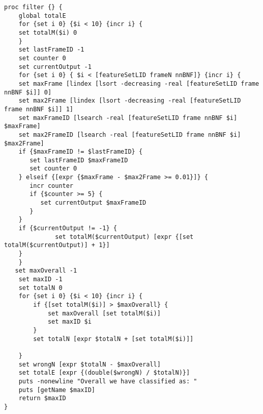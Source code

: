 \newpage
\begin{lstlisting}[label=lst:DifferenceFilter,caption=Difference Filter employed to smooth/improve output]
proc filter {} {
    global totalE
    for {set i 0} {$i < 10} {incr i} {
    set totalM($i) 0
    }
    set lastFrameID -1
    set counter 0
    set currentOutput -1
    for {set i 0} { $i < [featureSetLID frameN nnBNF]} {incr i} {
    set maxFrame [lindex [lsort -decreasing -real [featureSetLID frame nnBNF $i]] 0]
    set max2Frame [lindex [lsort -decreasing -real [featureSetLID frame nnBNF $i]] 1]
    set maxFrameID [lsearch -real [featureSetLID frame nnBNF $i] $maxFrame]
    set max2FrameID [lsearch -real [featureSetLID frame nnBNF $i] $max2Frame]
    if {$maxFrameID != $lastFrameID} {
       set lastFrameID $maxFrameID
       set counter 0
    } elseif {[expr {$maxFrame - $max2Frame >= 0.01}]} {
       incr counter
       if {$counter >= 5} {
          set currentOutput $maxFrameID
       }
    }
    if {$currentOutput != -1} {
              set totalM($currentOutput) [expr {[set totalM($currentOutput)] + 1}]
    }
    }
   set maxOverall -1
    set maxID -1
    set totalN 0
    for {set i 0} {$i < 10} {incr i} {
        if {[set totalM($i)] > $maxOverall} {
            set maxOverall [set totalM($i)]
            set maxID $i
        }
        set totalN [expr $totalN + [set totalM($i)]]

    }
    set wrongN [expr $totalN - $maxOverall]
    set totalE [expr {(double($wrongN) / $totalN)}]
    puts -nonewline "Overall we have classified as: "
    puts [getName $maxID]
    return $maxID
}
\end{lstlisting}
\newpage
